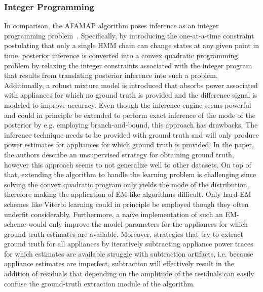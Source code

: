 \documentclass[11pt]{cmuthesis} %
\begin{document}
\subsubsection{Integer Programming}
In comparison, the AFAMAP algorithm poses inference as an integer programming problem~\cite{kolter2012approximate}. Specifically, by introducing the one-at-a-time constraint postulating that only a single HMM chain can change states at any given point in time, posterior inference is converted into a convex quadratic programming problem by relaxing the integer constraints associated with the integer program that results from translating posterior inference into such a problem. Additionally, a robust mixture model is introduced that absorbs power associated with appliances for which no ground truth is provided and the difference signal is modeled to improve accuracy. Even though the inference engine seems powerful and could in principle be extended to perform exact inference of the mode of the posterior by e.g. employing branch-and-bound, this approach has drawbacks. The inference technique needs to be provided with ground truth and will only produce power estimates for appliances for which ground truth is provided. In the paper, the authors describe an unsupervised strategy for obtaining ground truth, however this approach seems to not generalize well to other datasets. On top of that, extending the algorithm to handle the learning problem is challenging since solving the convex quadratic program only yields the mode of the distribution, therefore making the application of EM-like algorithms difficult. Only hard-EM schemes like Viterbi learning could in principle be employed though they often underfit considerably. Furthermore, a na\"ive implementation of such an EM-scheme would only improve the model parameters for the appliances for which ground truth estimates are available. Moreover, strategies that try to extract ground truth for all appliances by iteratively subtracting appliance power traces for which estimates are available struggle with subtraction artifacts, i.e. because appliance estimates are imperfect, subtraction will effectively result in the addition of residuals that depending on the amplitude of the residuals can easily confuse the ground-truth extraction module of the algorithm.
\end{document}
